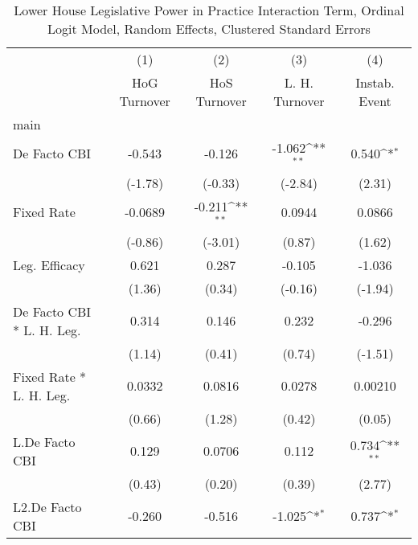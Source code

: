 {
\def\sym#1{\ifmmode^{#1}\else\(^{#1}\)\fi}
\begin{longtable}{l*{4}{c}}
\caption{Lower House Legislative Power in Practice Interaction Term, Ordinal Logit Model, Random Effects, Clustered Standard Errors \label{llpintlagordLogDF}}\\
\hline\hline\endfirsthead\hline\endhead\hline\endfoot\endlastfoot
                &\multicolumn{1}{c}{(1)}&\multicolumn{1}{c}{(2)}&\multicolumn{1}{c}{(3)}&\multicolumn{1}{c}{(4)}\\
                &\multicolumn{1}{c}{HoG Turnover}&\multicolumn{1}{c}{HoS Turnover}&\multicolumn{1}{c}{L. H. Turnover}&\multicolumn{1}{c}{Instab. Event}\\
\hline
main            &                  &                  &                  &                  \\
De Facto CBI    &   -0.543         &   -0.126         &   -1.062\sym{**} &    0.540\sym{*}  \\
                &  (-1.78)         &  (-0.33)         &  (-2.84)         &   (2.31)         \\
[1em]
Fixed Rate      &  -0.0689         &   -0.211\sym{**} &   0.0944         &   0.0866         \\
                &  (-0.86)         &  (-3.01)         &   (0.87)         &   (1.62)         \\
[1em]
Leg. Efficacy   &    0.621         &    0.287         &   -0.105         &   -1.036         \\
                &   (1.36)         &   (0.34)         &  (-0.16)         &  (-1.94)         \\
[1em]
De Facto CBI * L. H. Leg.&    0.314         &    0.146         &    0.232         &   -0.296         \\
                &   (1.14)         &   (0.41)         &   (0.74)         &  (-1.51)         \\
[1em]
Fixed Rate * L. H. Leg.&   0.0332         &   0.0816         &   0.0278         &  0.00210         \\
                &   (0.66)         &   (1.28)         &   (0.42)         &   (0.05)         \\
[1em]
L.De Facto CBI  &    0.129         &   0.0706         &    0.112         &    0.734\sym{**} \\
                &   (0.43)         &   (0.20)         &   (0.39)         &   (2.77)         \\
[1em]
L2.De Facto CBI &   -0.260         &   -0.516         &   -1.025\sym{*}  &    0.737\sym{*}  \\

\end{longtable}}

